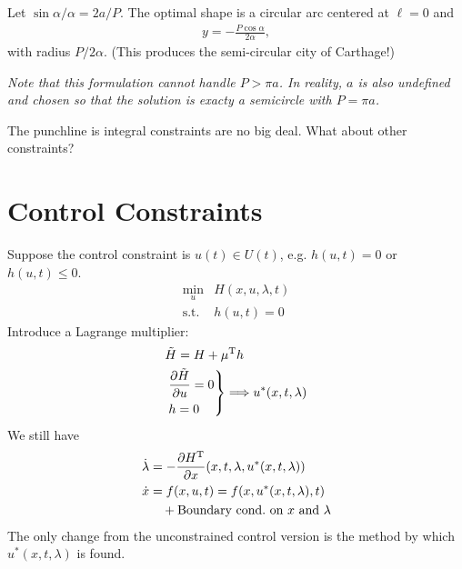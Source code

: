 Let $\sin\alpha/\alpha = 2a/P$. The optimal shape is a circular arc centered at $\ell=0$ and
\begin{gather}
  y = - \frac{P\cos\alpha}{2\alpha},
\end{gather}
with radius $P/2\alpha$. (This produces the semi-circular city of Carthage!)
\begin{center}
\end{center}
\emph{Note that this formulation cannot handle $P>\pi a$. In reality, $a$ is also undefined and chosen so that the solution is exacty a semicircle with $P=\pi a$.}

The punchline is integral constraints are no big deal. What about other constraints?

\section{Control Constraints}
Suppose the control constraint is $u(t)\in U(t)$, e.g. $h(u,t)=0$ or $h(u,t)\le 0$.
\begin{align}
  \min_u {} & H(x,u,\lambda,t) \\
  \text{s.t. } & h(u,t) = 0
\end{align}
Introduce a Lagrange multiplier:
\begin{align}
  & \tilde H = H + \mu^\text{T} h \\
  & \left. \begin{aligned}
    & \frac{\partial \tilde H}{\partial u} = 0 \\
    & h = 0
  \end{aligned} \right\} \Longrightarrow u^*(x,t,\lambda)
\end{align}
We still have
\begin{align}
  \dot\lambda &= -\frac{\partial H^\text{T}}{\partial x} (x,t,\lambda,u^*(x,t,\lambda)) \\
  \dot x &= f(x,u,t) = f(x,u^*(x,t,\lambda),t) \\
              & \quad + \text{Boundary cond.\ on $x$ and $\lambda$}
\end{align}
The only change from the unconstrained control version is the method by which $u^*(x,t,\lambda)$ is found.


